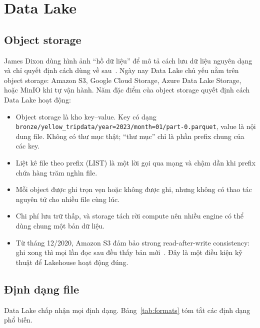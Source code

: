 \documentclass[12pt]{article}
\begin{document}
\section{Data Lake}
\label{sec:lake}

\subsection{Object storage}

James Dixon dùng hình ảnh ``hồ dữ liệu'' để mô tả cách lưu dữ liệu nguyên dạng và chỉ quyết định cách dùng về sau~\cite{dixon2010datalake}. Ngày nay Data Lake chủ yếu nằm trên object storage: Amazon S3, Google Cloud Storage, Azure Data Lake Storage, hoặc MinIO khi tự vận hành. Năm đặc điểm của object storage quyết định cách Data Lake hoạt động:

\begin{itemize}
    \item Object storage là kho key--value. Key có dạng \nolinkurl{bronze/yellow_tripdata/year=2023/month=01/part-0.parquet}, value là nội dung file. Không có thư mục thật; ``thư mục'' chỉ là phần prefix chung của các key.
    \item Liệt kê file theo prefix (LIST) là một lời gọi qua mạng và chậm dần khi prefix chứa hàng trăm nghìn file.
    \item Mỗi object được ghi trọn vẹn hoặc không được ghi, nhưng không có thao tác nguyên tử cho nhiều file cùng lúc.
    \item Chi phí lưu trữ thấp, và storage tách rời compute nên nhiều engine có thể dùng chung một bản dữ liệu.
    \item Từ tháng 12/2020, Amazon S3 đảm bảo strong read-after-write consistency: ghi xong thì mọi lần đọc sau đều thấy bản mới~\cite{aws2020consistency}. Đây là một điều kiện kỹ thuật để Lakehouse hoạt động đúng.
\end{itemize}

\subsection{Định dạng file}

Data Lake chấp nhận mọi định dạng. Bảng~\ref{tab:formats} tóm tắt các định dạng phổ biến.
\end{document}
